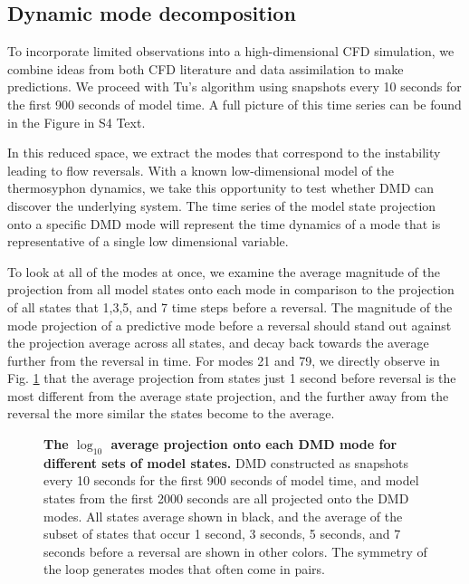 \documentclass[10pt,letterpaper]{article}
\begin{document}
\subsection*{Dynamic mode decomposition}
\label{dmd_section}

To incorporate limited observations into a high-dimensional CFD simulation, we combine ideas from both CFD literature and data assimilation to make predictions.
We proceed with Tu's algorithm using snapshots every 10 seconds for the first 900 seconds of model time.
A full picture of this time series can be found in the Figure in S4 Text.

In this reduced space, we extract the modes that correspond to the instability leading to flow reversals.
With a known low-dimensional model of the thermosyphon dynamics, we take this opportunity to test whether DMD can discover the underlying system.
The time series of the model state projection onto a specific DMD mode will represent the time dynamics of a mode that is representative of a single low dimensional variable.

To look at all of the modes at once, we examine the average magnitude of the projection from all model states onto each mode in comparison to the projection of all states that 1,3,5, and 7 time steps before a reversal.
The magnitude of the mode projection of a predictive mode before a reversal should stand out against the projection average across all states, and decay back towards the average further from the reversal in time.
For modes 21 and 79, we directly observe in Fig. \ref{fig:DMD_modes} that the average projection from states just 1 second before reversal is the most different from the average state projection, and the further away from the reversal the more similar the states become to the average.

\begin{figure}[h]
  \centering
  \caption[]{
\textbf{    The $\log_{10}$ average projection onto each DMD mode for different sets of model states.
}    DMD constructed as snapshots every 10 seconds for the first 900 seconds of model time, and model states from the first 2000 seconds are all projected onto the DMD modes.
    All states average shown in black, and the average of the subset of states that occur 1 second, 3 seconds, 5 seconds, and 7 seconds before a reversal are shown in other colors.
    The symmetry of the loop generates modes that often come in pairs.
      }
  \label{fig:DMD_modes}
\end{figure}
\end{document}
